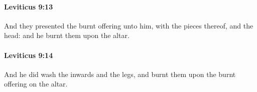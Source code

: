 		\paragraph{Leviticus 9:13} %
			\label{LEVITICUS-9-13}

			And they presented the burnt offering unto him, with the pieces thereof, and the head: and he burnt them upon the altar.


		\paragraph{Leviticus 9:14} %
			\label{LEVITICUS-9-14}

			And he did wash the inwards and the legs, and burnt them upon the burnt offering on the altar.


